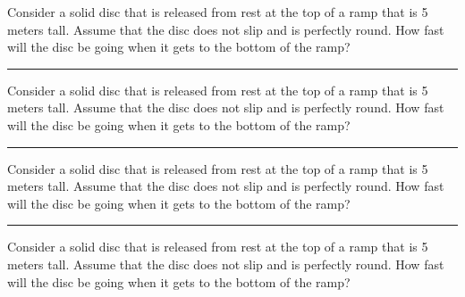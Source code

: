 \documentclass[12pt]{exam}
\begin{document}
\Large

\newcommand{\myproblem}{
  \noindent
  Consider a solid disc that is released from rest at the top of a ramp that is 5 meters tall. Assume that the disc does not slip and is perfectly round. How fast will the disc be going when it gets to the bottom of the ramp?
}

\vspace*{1em}

\myproblem

\vs \hrule \vs 

\myproblem

\vs \hrule \vs

\myproblem

\vs \hrule \vs

\myproblem

\vspace{1em}
\end{document}
